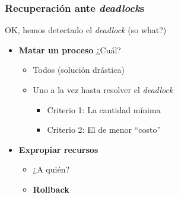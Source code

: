 \documentclass[letter]{beamer}
\begin{document}
\begin{frame}
  \frametitle{Recuperación ante {\em deadlock}s}

  OK, hemos detectado el {\em deadlock} (so what?)
  
  \begin{itemize}
    \item<3-> {\bf Matar un proceso} ¿Cuál?
      \begin{itemize}
        \item<4-> Todos (solución drástica)
        \item<5-> Uno a la vez hasta resolver el {\em deadlock}
          \begin{itemize}
            \item Criterio 1: La cantidad mínima
            \item Criterio 2: El de menor ``costo''
          \end{itemize}
      \end{itemize}
    \item<6-> {\bf Expropiar recursos}
      \begin{itemize}
        \item ¿A quién?
        \item {\bf Rollback}
      \end{itemize}
  \end{itemize}

\end{frame}
\end{document}
